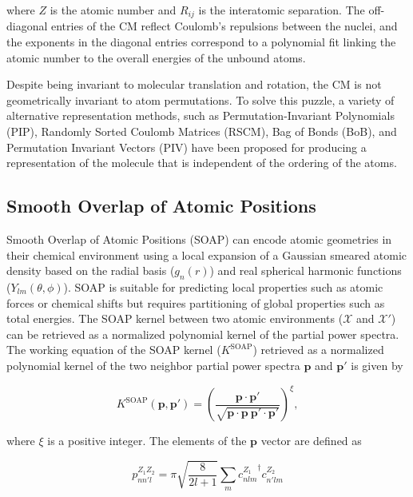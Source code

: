 \noindent where $Z$ is the atomic number and $R_{ij}$ is the interatomic separation. The off-diagonal entries 
of the CM reflect Coulomb's repulsions between the nuclei, and the exponents in the diagonal entries 
correspond to a polynomial fit linking the atomic number to the overall energies of the unbound atoms. 

Despite being invariant to molecular translation and rotation, the CM is not geometrically invariant to 
atom permutations. To solve this puzzle, a variety of alternative representation methods, such as 
Permutation-Invariant Polynomials (PIP)\cite{braams2009}, Randomly Sorted Coulomb Matrices (RSCM)\cite{hansen2013}, 
Bag of Bonds (BoB)\cite{hansen2013}, and Permutation Invariant Vectors (PIV)\cite{gallet2013} have been 
proposed for producing a representation of the molecule that is independent of the ordering of the atoms.

\subsection{Smooth Overlap of Atomic Positions}

Smooth Overlap of Atomic Positions (SOAP) can encode atomic geometries in their chemical environment 
using a local expansion of a Gaussian smeared atomic density based on the radial basis ($g_{n}(r)$) and 
real spherical harmonic functions ($Y_{lm}(\theta, \phi)$).\cite{bartok2013,de2016} SOAP is suitable for predicting 
local properties such as atomic forces or chemical shifts but requires partitioning of global properties 
such as total energies. The SOAP kernel between two atomic environments ($\mathcal{X}$ and $\mathcal{X}'$) 
can be retrieved as a normalized polynomial kernel of the partial power spectra. The working equation of 
the SOAP kernel ($K^\mathrm{SOAP}$) retrieved as a normalized polynomial kernel of the two neighbor partial 
power spectra $\mathbf{p}$ and $\mathbf{p}'$ is given by

\begin{equation}
    K^\mathrm{SOAP}(\mathbf{p}, \mathbf{p'}) = \left( \frac{\mathbf{p} \cdot \mathbf{p'}}{\sqrt{\mathbf{p} 
    \cdot \mathbf{p}~\mathbf{p'} \cdot \mathbf{p'}}}\right)^{\xi},
\end{equation}

\noindent where $\xi$ is a positive integer. The elements of the $\mathbf{p}$ vector are defined as 

\begin{equation}
    p^{Z_1 Z_2}_{n n' l} = \pi \sqrt{\frac{8}{2l+1}}\sum_m {c^{Z_1}_{n l m}}^{\dagger} c^{Z_2}_{n' l m}
\end{equation}

